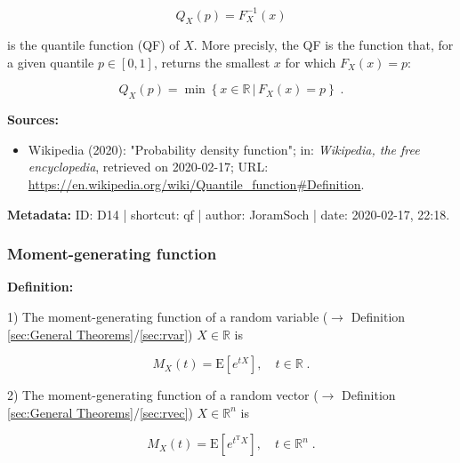 \documentclass[a4paper,12pt,twoside]{book}
\begin{document}
\begin{equation} \label{eq:qf-qf}
Q_X(p) = F_X^{-1}(x)
\end{equation}

is the quantile function (QF) of $X$. More precisly, the QF is the function that, for a given quantile $p \in [0,1]$, returns the smallest $x$ for which $F_X(x) = p$:

\begin{equation} \label{eq:qf-qf-prec}
Q_X(p) = \min \left\lbrace x \in \mathbb{R} \, \vert \, F_X(x) = p \right\rbrace \; .
\end{equation}


\vspace{1em}
\textbf{Sources:}
\begin{itemize}
\item Wikipedia (2020): "Probability density function"; in: \textit{Wikipedia, the free encyclopedia}, retrieved on 2020-02-17; URL: \url{https://en.wikipedia.org/wiki/Quantile_function#Definition}.
\end{itemize}


\vspace{1em}
\textbf{Metadata:} ID: D14 | shortcut: qf | author: JoramSoch | date: 2020-02-17, 22:18.
\vspace{1em}



\subsubsection[\textit{Moment-generating function}]{Moment-generating function} \label{sec:mgf}
\setcounter{equation}{0}

\textbf{Definition:}

1) The moment-generating function of a random variable ($\rightarrow$ Definition \ref{sec:General Theorems}/\ref{sec:rvar}) $X \in \mathbb{R}$ is

\begin{equation} \label{eq:mgf-mgf-var}
M_X(t) = \mathrm{E} \left[ e^{tX} \right], \quad t \in \mathbb{R} \; .
\end{equation}

2) The moment-generating function of a random vector ($\rightarrow$ Definition \ref{sec:General Theorems}/\ref{sec:rvec}) $X \in \mathbb{R}^n$ is

\begin{equation} \label{eq:mgf-mgf-vec}
M_X(t) = \mathrm{E} \left[ e^{t^\mathrm{T}X} \right], \quad t \in \mathbb{R}^n \; .
\end{equation}
\end{document}
